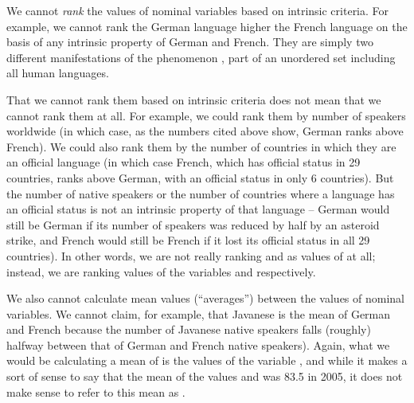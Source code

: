 We cannot \emph{rank} the values of nominal variables based on intrinsic criteria. For example, we cannot rank the German language higher the French language on the basis of any intrinsic property of German and French. They are simply two different manifestations of the phenomenon , part of an unordered set including all human languages.

That we cannot rank them based on intrinsic criteria does not mean that we cannot rank them at all. For example, we could rank them by number of speakers worldwide (in which case, as the numbers cited above show, German ranks above French). We could also rank them by the number of countries in which they are an official language (in which case French, which has official status in 29 countries, ranks above German, with an official status in only 6 countries). But the number of native speakers or the number of countries where a language has an official status is not an intrinsic property of that language -- German would still be German if its number of speakers was reduced by half by an asteroid strike, and French would still be French if it lost its official status in all 29 countries). In other words,
we are not really ranking  and  as values of  at all; instead, we are ranking values of the variables  and  respectively.

We also cannot calculate mean values (``averages'') between the values of nominal variables. We cannot claim, for example, that Javanese is the mean of German and French because the number of Javanese native speakers falls (roughly) halfway between that of German and French native speakers). Again, what we would be calculating a mean of is the values of the variable , and while it makes a sort of sense to say that the mean of the values  and  was 83.5 in 2005, it does not make sense to refer to this mean as . 


